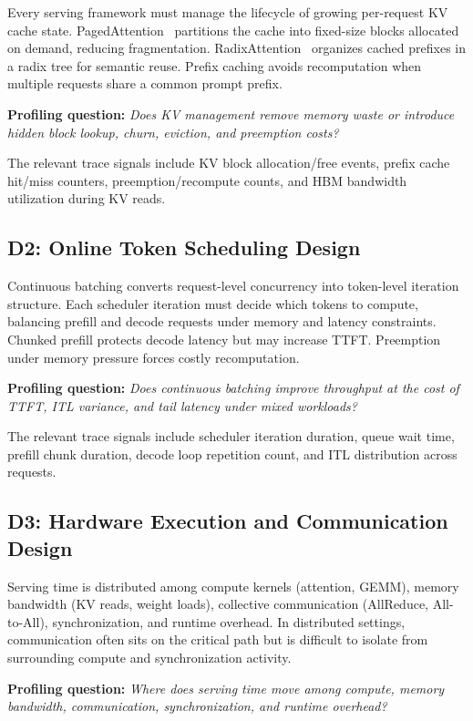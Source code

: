 \documentclass[conference]{IEEEtran}
\begin{document}
Every serving framework must manage the lifecycle of growing per-request KV
cache state. PagedAttention~\cite{vllm} partitions the cache into fixed-size
blocks allocated on demand, reducing fragmentation. RadixAttention~\cite{sglang}
organizes cached prefixes in a radix tree for semantic reuse. Prefix caching
avoids recomputation when multiple requests share a common prompt prefix.

\textbf{Profiling question:} \emph{Does KV management remove memory waste or
introduce hidden block lookup, churn, eviction, and preemption costs?}

The relevant trace signals include KV block allocation/free events, prefix
cache hit/miss counters, preemption/recompute counts, and HBM bandwidth
utilization during KV reads.

\subsection{D2: Online Token Scheduling Design}

Continuous batching converts request-level concurrency into token-level
iteration structure. Each scheduler iteration must decide which tokens to
compute, balancing prefill and decode requests under memory and latency
constraints. Chunked prefill protects decode latency but may increase TTFT.
Preemption under memory pressure forces costly recomputation.

\textbf{Profiling question:} \emph{Does continuous batching improve throughput
at the cost of TTFT, ITL variance, and tail latency under mixed workloads?}

The relevant trace signals include scheduler iteration duration, queue wait
time, prefill chunk duration, decode loop repetition count, and ITL
distribution across requests.

\subsection{D3: Hardware Execution and Communication Design}

Serving time is distributed among compute kernels (attention, GEMM), memory
bandwidth (KV reads, weight loads), collective communication (AllReduce,
All-to-All), synchronization, and runtime overhead. In distributed settings,
communication often sits on the critical path but is difficult to isolate
from surrounding compute and synchronization activity.

\textbf{Profiling question:} \emph{Where does serving time move among compute,
memory bandwidth, communication, synchronization, and runtime overhead?}
\end{document}
